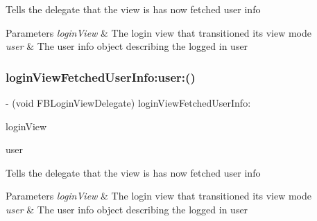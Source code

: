 Tells the delegate that the view is has now fetched user info


\begin{DoxyParams}{Parameters}
{\em login\+View} & The login view that transitioned its view mode\\
\hline
{\em user} & The user info object describing the logged in user \\
\hline
\end{DoxyParams}
\mbox{\label{protocolFBLoginViewDelegate_01-p_a6dfcb82e159aa83b726797ec2de6877c}} 
\subsubsection{\texorpdfstring{login\+View\+Fetched\+User\+Info\+:user\+:()}{loginViewFetchedUserInfo:user:()}\hspace{0.1cm}{\footnotesize\ttfamily [3/5]}}
{\footnotesize\ttfamily -\/ (void F\+B\+Login\+View\+Delegate) login\+View\+Fetched\+User\+Info\+: \begin{DoxyParamCaption}\item[{(\hyperlink{interfaceFBLoginView}{F\+B\+Login\+View} $\ast$)}]{login\+View }\item[{user:(id$<$ \hyperlink{protocolFBGraphUser-p}{F\+B\+Graph\+User} $>$)}]{user }\end{DoxyParamCaption}\hspace{0.3cm}{\ttfamily [optional]}}

Tells the delegate that the view is has now fetched user info


\begin{DoxyParams}{Parameters}
{\em login\+View} & The login view that transitioned its view mode\\
\hline
{\em user} & The user info object describing the logged in user \\
\hline
\end{DoxyParams}
\mbox{\label{protocolFBLoginViewDelegate_01-p_a6dfcb82e159aa83b726797ec2de6877c}} 
